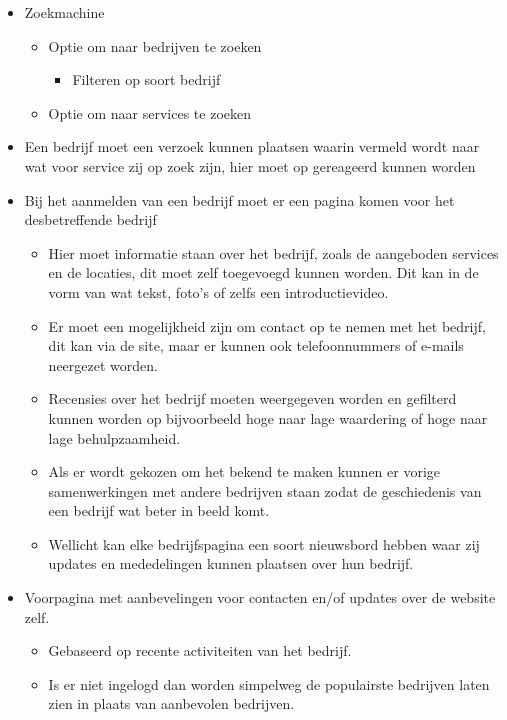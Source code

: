 \begin{itemize}
\item
  Zoekmachine
  \begin{itemize}
  \item
    Optie om naar bedrijven te zoeken
    \begin{itemize}
    \item
      Filteren op soort bedrijf
    \end{itemize}
  \item
    Optie om naar services te zoeken
  \end{itemize}
\item  
  Een bedrijf moet een verzoek kunnen plaatsen waarin vermeld wordt naar
  wat voor service zij op zoek zijn, hier moet op gereageerd kunnen
  worden
\item
  Bij het aanmelden van een bedrijf moet er een pagina komen voor het
  desbetreffende bedrijf
  
  \begin{itemize}
  \item
    Hier moet informatie staan over het bedrijf,
    zoals de aangeboden services en de locaties,
    dit moet zelf toegevoegd kunnen worden.
    Dit kan in de vorm van wat tekst,
    foto’s of zelfs een introductievideo.
  \item
    Er moet een mogelijkheid zijn om contact op te nemen met het bedrijf,
    dit kan via de site, maar er kunnen ook telefoonnummers of
    e-mails neergezet worden.
  \item
    Recensies over het bedrijf moeten weergegeven worden en
    gefilterd kunnen worden op bijvoorbeeld hoge naar lage waardering of
    hoge naar lage behulpzaamheid.
  \item
    Als er wordt gekozen om het bekend te maken kunnen er vorige
    samenwerkingen met andere bedrijven staan zodat de geschiedenis van
    een bedrijf wat beter in beeld komt.
  \item
    Wellicht kan elke bedrijfspagina een soort nieuwsbord hebben
    waar zij updates en mededelingen kunnen plaatsen over hun bedrijf.
  \end{itemize}

  \item
    Voorpagina met aanbevelingen voor contacten en/of updates over de
    website zelf.
  
  \begin{itemize}
  \item
    Gebaseerd op recente activiteiten van het bedrijf.
  \item
    Is er niet ingelogd dan worden simpelweg de populairste
    bedrijven laten zien in plaats van aanbevolen bedrijven.
  \end{itemize}
\end{itemize}

